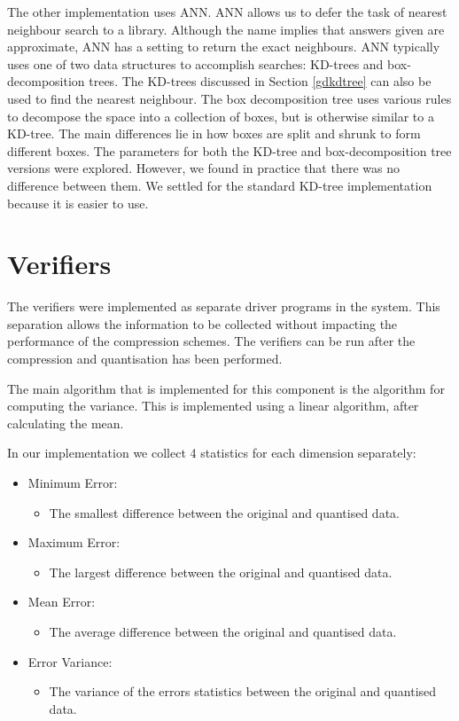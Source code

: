 \documentclass[a4paper,11pt]{report}
\begin{document}
The other implementation uses ANN\cite{ann}. ANN allows us to defer the task of nearest neighbour search to a library. Although the name implies that answers given are approximate, ANN has a setting to return the exact neighbours. ANN typically uses one of two data structures to accomplish searches: KD-trees and box-decomposition trees. The KD-trees discussed in Section \ref{gdkdtree} can also be used to find the nearest neighbour. The box decomposition tree uses various rules to decompose the space into a collection of boxes, but is otherwise similar to a KD-tree. The main differences lie in how boxes are split and shrunk to form different boxes. The parameters for both the KD-tree and box-decomposition tree versions were explored. However, we found in practice that there was no difference between them. We settled for the standard KD-tree implementation because it is easier to use.

\section{Verifiers}

The verifiers were implemented as separate driver programs in the system. This separation allows the information to be collected without impacting the performance of the compression schemes. The verifiers can be run after the compression and quantisation has been performed.

The main algorithm that is implemented for this component is the algorithm for computing the variance. This is implemented using a linear algorithm, after calculating the mean.

In our implementation we collect 4 statistics for each dimension separately:
\begin{itemize}
 \item Minimum Error: 
 \begin{itemize}
   \item The smallest difference between the original and quantised data.
 \end{itemize}
 \item Maximum Error:
 \begin{itemize}
   \item The largest difference between the original and quantised data.
 \end{itemize}
 \item Mean Error:
 \begin{itemize}
   \item The average difference between the original and quantised data.
 \end{itemize}
 \item Error Variance:
 \begin{itemize}
   \item The variance of the errors statistics between the original and quantised data.  
 \end{itemize}
\end{itemize}
\end{document}
